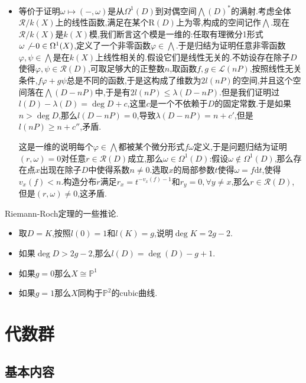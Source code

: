 \begin{enumerate}
\begin{itemize}
    	\item 等价于证明$\omega\mapsto (-,\omega)$是从$\Omega^1(D)$到对偶空间$\bigwedge(D)^*$的满射.考虑全体$\mathscr{R}/k(X)$上的线性函数,满足在某个$\mathrm{R}(D)$上为零,构成的空间记作$\bigwedge$.现在$\mathscr{R}/k(X)$是$k(X)$模,我们断言这个模是一维的:任取有理微分1形式$\omega\not-0\in\Omega^1(X)$,定义了一个非零函数$\varphi\in\bigwedge$.于是归结为证明任意非零函数$\varphi,\psi\in\bigwedge$是在$k(X)$上线性相关的.假设它们是线性无关的.不妨设存在除子$D$使得$\varphi,\psi\in\mathscr{R}(D)$,可取足够大的正整数$n$,取函数$f,g\in\mathscr{L}(nP)$,按照线性无关条件,$f\varphi+g\psi$总是不同的函数,于是这构成了维数为$2l(nP)$的空间,并且这个空间落在$\bigwedge(D-nP)$中,于是有$2l(nP)\le\lambda(D-nP)$.但是我们证明过$l(D)-\lambda(D)=\deg D+c$,这里$c$是一个不依赖于$D$的固定常数.于是如果$n>\deg D$,那么$l(D-nP)=0$,导致$\lambda(D-nP)=n+c'$,但是$l(nP)\ge n+c''$,矛盾.
    	
    	这是一维的说明每个$\varphi\in\bigwedge$都被某个微分形式$f\omega$定义,于是问题归结为证明$(r,\omega)=0$对任意$r\in\mathscr{R}(D)$成立,那么$\omega\in\Omega^1(D)$:假设$\omega\not\in\Omega^1(D)$,那么存在点$x$出现在除子$D$中使得系数$n\not=0$.选取$x$的局部参数$t$使得$\omega=f\mathrm{d}t$,使得$v_x(f)<n$.构造分布$r$满足$r_x=t^{-v_x(f)-1}$和$r_y=0,\forall y\not=x$,那么$r\in\mathscr{R}(D)$,但是$(r,\omega)\not=0$,这矛盾.
    \end{itemize}
\end{enumerate}

Riemann-Roch定理的一些推论.
\begin{itemize}
	\item 取$D=K$,按照$l(0)=1$和$l(K)=g$,说明$\deg K=2g-2$.
	\item 如果$\deg D>2g-2$,那么$l(D)=\deg(D)-g+1$.
	\item 如果$g=0$那么$X\cong\mathbb{P}^1$
	\item 如果$g=1$那么$X$同构于$\mathbb{P}^2$的cubic曲线.
\end{itemize}

\newpage
\section{代数群}
\subsection{基本内容}

